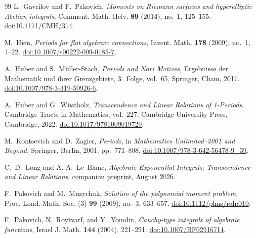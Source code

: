 \documentclass[11pt]{article}
\numberwithin{equation}{section}
\theoremstyle{definition}
\theoremstyle{remark}
\begin{document}
\begin{thebibliography}{99}
L.~Gavrilov and F.~Pakovich,
\emph{Moments on Riemann surfaces and hyperelliptic Abelian integrals},
Comment. Math. Helv. \textbf{89} (2014), no.~1, 125--155.
\href{https://doi.org/10.4171/CMH/314}{doi:10.4171/CMH/314}.

M.~Hien,
\emph{Periods for flat algebraic connections},
Invent. Math. \textbf{178} (2009), no.~1, 1--22.
\href{https://doi.org/10.1007/s00222-009-0185-7}{doi:10.1007/\allowbreak s00222-009-0185-7}.

A.~Huber and S.~M\"uller-Stach,
\emph{Periods and Nori Motives},
Ergebnisse der Mathematik und ihrer Grenzgebiete, 3.~Folge, vol.~65,
Springer, Cham, 2017.
\href{https://doi.org/10.1007/978-3-319-50926-6}{doi:10.1007/978-3-319-50926-6}.

A.~Huber and G.~W\"ustholz,
\emph{Transcendence and Linear Relations of 1-Periods},
Cambridge Tracts in Mathematics, vol.~227,
Cambridge University Press, Cambridge, 2022.
\href{https://doi.org/10.1017/9781009019729}{doi:10.1017/9781009019729}.

M.~Kontsevich and D.~Zagier,
\emph{Periods},
in \emph{Mathematics Unlimited--2001 and Beyond},
Springer, Berlin, 2001, pp.~771--808.
\href{https://doi.org/10.1007/978-3-642-56478-9_39}{doi:10.1007/978-3-642-56478-9\_39}.

C.~D.~Long and A.-A.~Le~Blanc,
\emph{Algebraic Exponential Integrals: Transcendence and Linear Relations},
companion preprint, August 2026.

F.~Pakovich and M.~Muzychuk,
\emph{Solution of the polynomial moment problem},
Proc. Lond. Math. Soc. (3) \textbf{99} (2009), no.~3, 633--657.
\href{https://doi.org/10.1112/plms/pdp010}{doi:10.1112/plms/pdp010}.

F.~Pakovich, N.~Roytvarf, and Y.~Yomdin,
\emph{Cauchy-type integrals of algebraic functions},
Israel J. Math. \textbf{144} (2004), 221--291.
\href{https://doi.org/10.1007/BF02916714}{doi:10.1007/BF02916714}.

\end{thebibliography}
\end{document}
